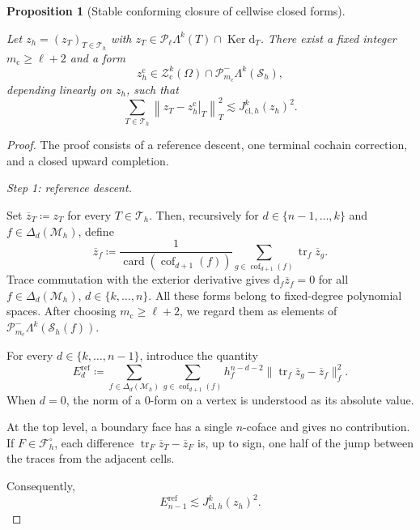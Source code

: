 \documentclass[a4paper,11pt]{article}
\newtheorem{proposition}[theorem]{Proposition}
\theoremstyle{definition}
\newcommand{\DIFF}{\mathrm{d}}
\newcommand{\Mh}{\mathcal{M}_h}
\newcommand{\Sh}{\mathcal{S}_h}
\newcommand{\card}{\operatorname{card}}
\newcommand{\FM}[1]{\Delta_{#1}}
\newcommand{\cof}[1]{\operatorname{cof}_{#1}}
\newcommand{\PL}[2]{\mathcal{P}_{#1}\Lambda^{#2}}
\newcommand{\PLtrim}[2]{\mathcal{P}_{#1}^{-}\Lambda^{#2}}
\newcommand{\trc}{\operatorname{tr}}
\newcommand{\Ker}{\operatorname{Ker}}
\begin{document}
\begin{proposition}[Stable conforming closure of cellwise closed forms]
\label{prop:stable.conforming.closure}

Let $z_h=(z_T)_{T\in\mathcal T_h}$ with $z_T\in\PL{\ell}{k}(T)\cap\Ker\DIFF_T$.
There exist a fixed integer $m_{\mathrm c}\geq\ell+2$ and a form
\[
  z_h^{\mathrm c}
  \in\mathcal Z_{\mathrm c}^k(\Omega)\cap\PLtrim{m_{\mathrm c}}{k}(\Sh),
\]
depending linearly on $z_h$, such that
\begin{equation}
\label{eq:stable.conforming.closure}
  \sum_{T\in\mathcal T_h}
  \left\|
    z_T-\left.z_h^{\mathrm c}\right|_T
  \right\|_T^2
  \lesssim
  J_{\mathrm{cl},h}^k(z_h)^2.
\end{equation}
\end{proposition}
\begin{proof}
The proof consists of a reference descent, one terminal cochain correction, and a closed upward completion.

\medskip
\noindent\emph{Step 1: reference descent.}

Set $\overline z_T\coloneqq z_T$ for every $T\in\mathcal T_h$.
Then, recursively for $d \in \{n-1,\ldots,k\}$ and $f\in\FM{d}(\Mh)$, define
\begin{equation}
\label{eq:reference.closed.descent}
  \overline z_f
  \coloneqq
  \frac{1}{
    \card(\cof{d+1}(f))
  }
  \sum_{g\in\cof{d+1}(f)}
  \trc_f\overline z_g.
\end{equation}
Trace commutation with the exterior derivative gives $\DIFF_f\overline z_f=0$ for all $f\in\FM{d}(\Mh)$, $d\in\{k,\ldots,n\}$.
All these forms belong to fixed-degree polynomial spaces.
After choosing $m_{\mathrm c}\geq\ell+2$, we regard them as elements of $\PLtrim{m_{\mathrm c}}{k}(\Sh(f))$.

For every $d\in\{k,\ldots,n-1\}$, introduce the quantity
\[
  E_d^{\mathrm{ref}}
  \coloneqq
  \sum_{f\in\FM{d}(\Mh)}
  \sum_{g\in\cof{d+1}(f)}
  h_f^{n-d-2}
  \|
    \trc_f\overline z_g-\overline z_f
  \|_f^2.
\]
When $d=0$, the norm of a $0$-form on a vertex is understood as its absolute value.

At the top level, a boundary face has a single $n$-coface and gives no contribution.
If $F\in\mathcal F_h^\circ$, each difference $\trc_F\overline z_T-\overline z_F$ is, up to sign, one half of the jump between the traces from the adjacent cells.

Consequently,
\begin{equation}
\label{eq:reference.top.defect}
  E_{n-1}^{\mathrm{ref}}
  \lesssim
  J_{\mathrm{cl},h}^k(z_h)^2.
\end{equation}


\end{proof}
\end{document}
